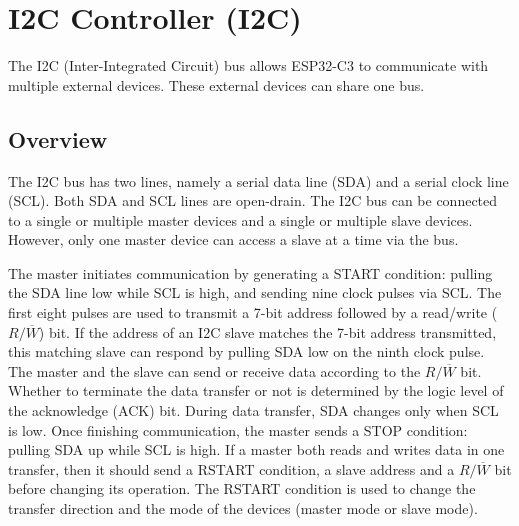 \documentclass[main\_\_EN.tex]{subfiles}
\begin{document}

\ifglobal
\else
    {\let\clearpage\relax \listoftodos}
    \tableofcontents
\fi



\hypertarget{i2c}{}
\chapter{I2C Controller (I2C)}
\label{mod:i2c}


The I2C (Inter-Integrated Circuit) bus allows ESP32-C3 to communicate with multiple external devices. These external devices can share one bus.


\section{Overview}
The I2C bus has two lines, namely a serial data line (SDA) and a serial clock line (SCL). Both SDA and SCL lines are open-drain. The I2C bus can be connected to a single or multiple master devices and a single or multiple slave devices. However, only one master device can access a slave at a time via the bus.

The master initiates communication by generating a START condition: pulling the SDA line low while SCL is high, and sending nine clock pulses via SCL. The first eight pulses are used to transmit a 7-bit address followed by a read/write ($R/\overline W$) bit. If the address of an I2C slave matches the 7-bit address transmitted, this matching slave can respond by pulling SDA low on the ninth clock pulse. The master and the slave can send or receive data according to the $R/\overline W$ bit. Whether to terminate the data transfer or not is determined by the logic level of the acknowledge (ACK) bit. During data transfer, SDA changes only when SCL is low. Once finishing communication, the master sends a STOP condition: pulling SDA up while SCL is high. If a master both reads and writes data in one transfer, then it should send a RSTART condition, a slave address and a $R/\overline W$ bit before changing its operation. The RSTART condition is used to change the transfer direction and the mode of the devices (master mode or slave mode).
\end{document}
